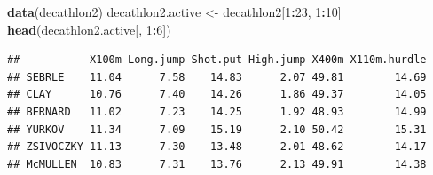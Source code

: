 \documentclass[
]{article}
\newenvironment{Shaded}{\begin{snugshade}}{\end{snugshade}}
\newcommand{\DataTypeTok}[1]{\textcolor[rgb]{0.13,0.29,0.53}{#1}}
\newcommand{\DecValTok}[1]{\textcolor[rgb]{0.00,0.00,0.81}{#1}}
\newcommand{\KeywordTok}[1]{\textcolor[rgb]{0.13,0.29,0.53}{\textbf{#1}}}
\newcommand{\NormalTok}[1]{#1}
\newcommand{\OperatorTok}[1]{\textcolor[rgb]{0.81,0.36,0.00}{\textbf{#1}}}
\newcommand{\OtherTok}[1]{\textcolor[rgb]{0.56,0.35,0.01}{#1}}
\newcommand{\StringTok}[1]{\textcolor[rgb]{0.31,0.60,0.02}{#1}}
\begin{document}
\begin{Shaded}
\begin{Highlighting}[]
\KeywordTok{data}\NormalTok{(decathlon2)}
\NormalTok{decathlon2.active <-}\StringTok{ }\NormalTok{decathlon2[}\DecValTok{1}\OperatorTok{:}\DecValTok{23}\NormalTok{, }\DecValTok{1}\OperatorTok{:}\DecValTok{10}\NormalTok{]}
\KeywordTok{head}\NormalTok{(decathlon2.active[, }\DecValTok{1}\OperatorTok{:}\DecValTok{6}\NormalTok{])}
\end{Highlighting}
\end{Shaded}

\begin{verbatim}
##           X100m Long.jump Shot.put High.jump X400m X110m.hurdle
## SEBRLE    11.04      7.58    14.83      2.07 49.81        14.69
## CLAY      10.76      7.40    14.26      1.86 49.37        14.05
## BERNARD   11.02      7.23    14.25      1.92 48.93        14.99
## YURKOV    11.34      7.09    15.19      2.10 50.42        15.31
## ZSIVOCZKY 11.13      7.30    13.48      2.01 48.62        14.17
## McMULLEN  10.83      7.31    13.76      2.13 49.91        14.38
\end{verbatim}

\begin{Shaded}
\end{Shaded}
\end{document}
